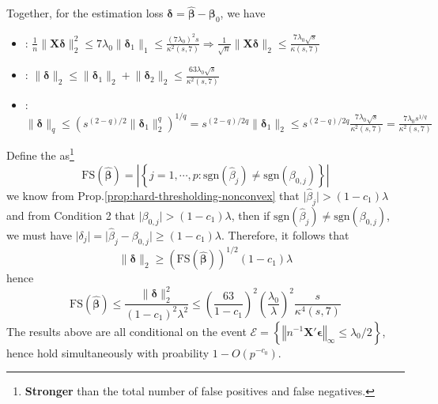 \documentclass[twoside]{article}
\begin{document}
Together, for the estimation loss $\boldsymbol{\delta}= \hat{\boldsymbol{\beta}} - \boldsymbol{\beta}_0$, we have
\begin{itemize}
    \item {}: $\frac{1}{n}\lVert \mathbf{X}\boldsymbol{\delta} \rVert^2_2 \leq 7\lambda_0\lVert \boldsymbol{\delta}_1 \rVert _1 \leq \frac{(7\lambda_0)^2s}{\kappa^2(s,7)}\Rightarrow \frac{1}{\sqrt{n}}\lVert \mathbf{X}\boldsymbol{\delta} \rVert _2 \leq \frac{7\lambda_0 \sqrt{s}}{\kappa(s,7)}$
    \item {}: $\lVert\boldsymbol{\delta}\rVert _2\leq \lVert\boldsymbol{\delta}_1\rVert _2+\lVert\boldsymbol{\delta}_2\rVert _2\leq \frac{63\lambda_0\sqrt{s}}{\kappa^2(s,7)}$
    \item {}: $\lVert\boldsymbol{\delta}\rVert _q \leq \left(s^{(2-q)/2}\lVert\boldsymbol{\delta}_1\rVert ^q_2\right)^{1/q} = s^{(2-q)/2q}\lVert\boldsymbol{\delta}_1\rVert _2 \leq s^{(2-q)/2q}\frac{7\lambda_0 \sqrt{s}}{\kappa^2(s,7)} = \frac{7\lambda_0 s^{1/q}}{\kappa^2(s,7)} $ 
    
\end{itemize}
Define the  as\footnote{\textbf{Stronger} than the total number of false positives and false negatives.}
    $$
    \mathrm{FS}\left(\hat{\boldsymbol{\beta}}\right) = \left\vert \left\{ j=1,\cdots,p: \mathrm{sgn}\left(\hat{\beta}_j\right) \neq \mathrm{sgn}\left(\beta_{0,j}\right) \right\} \right\vert
    $$
we know from Prop.\ref{prop:hard-thresholding-nonconvex} that $\lvert\hat{\beta}_j\rvert>(1-c_1)\lambda$ and from Condition 2 that $ \lvert \beta_{0,j}\rvert>(1-c_1)\lambda  $, then if $\mathrm{sgn}(\hat{\beta}_j)\neq \mathrm{sgn}(\beta_{0,j})$, we must have $ \lvert \delta_j \rvert = \lvert \hat{\beta}_j - \beta_{0,j} \rvert \geq (1-c_1)\lambda $. Therefore, it follows that 
$$
\lVert \boldsymbol{\delta} \rVert _2 \geq \left(\mathrm{FS}\left(\hat{\boldsymbol{\beta}}\right)\right)^{1/2}(1-c_1)\lambda
$$
hence 
$$
\mathrm{FS}\left(\hat{\boldsymbol{\beta}}\right) \leq \frac{\lVert \boldsymbol{\delta} \rVert ^2_2}{(1-c_1)^2\lambda^2} \leq \left(\frac{63}{1-c_1}\right)^2\left(\frac{\lambda_0}{\lambda}\right)^2\frac{s}{\kappa^4(s,7)}
$$
The results above are all conditional on the event $\mathcal{E} = \left\{ \left\Vert n^{-1}\mathbf{X}'\boldsymbol{\epsilon}  \right\Vert _{\infty}\leq \lambda_0 /2 \right\}$, hence hold simultaneously with proability $1-O(p^{-c_0})$.
\end{document}
